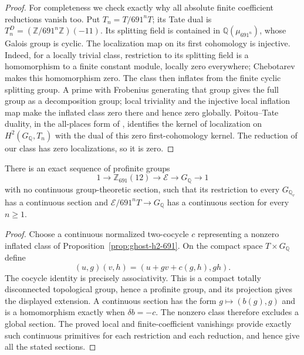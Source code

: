 \begin{proof}
For completeness we check exactly why all absolute finite
coefficient reductions vanish too. Put
\(T_n=T/691^nT\); its Tate dual is
\(T_n^D=(\mathbb Z/691^n\mathbb Z)(-11)\). Its splitting
field is contained in \(\mathbb Q(\mu_{691^n})\), whose Galois
group is cyclic. The localization map on its first cohomology
is injective. Indeed, for a locally trivial class, restriction
to its splitting field is a homomorphism to a finite constant
module, locally zero everywhere; Chebotarev makes this
homomorphism zero. The class then inflates from the finite
cyclic splitting group. A prime with Frobenius generating
that group gives the full group as a decomposition group;
local triviality and the injective local inflation map make
the inflated class zero there and hence zero globally.
Poitou--Tate duality, in the all-places form of
\cite[I.4.10]{GhostMilneADT}, identifies the kernel of
localization on \(H^2(G_{\mathbb Q},T_n)\) with the dual
of this zero first-cohomology kernel. The reduction of our
class has zero localizations, so it is zero.
\end{proof}

\begin{corollary}
\label{cor:ghost-integral-extension}
There is an exact sequence of profinite groups
\[
  1\longrightarrow\mathbb Z_{691}(12)
    \longrightarrow\mathcal E\longrightarrow G_{\mathbb Q}
    \longrightarrow1
\]
with no continuous group-theoretic section, such that its
restriction to every \(G_{\mathbb Q_v}\) has a continuous
section and \(\mathcal E/691^nT\to G_{\mathbb Q}\) has a
continuous section for every \(n\geq1\).
\end{corollary}
\begin{proof}
Choose a continuous normalized two-cocycle \(c\) representing
a nonzero inflated class of Proposition~\ref{prop:ghost-h2-691}.
On the compact space \(T\times G_{\mathbb Q}\) define
\[
 (u,g)(v,h)=(u+g v+c(g,h),gh).
\]
The cocycle identity is precisely associativity. This is a
compact totally disconnected topological group, hence a
profinite group, and its projection gives the displayed
extension. A continuous section has the form \(g\mapsto(b(g),g)\)
and is a homomorphism exactly when \(\delta b=-c\).
The nonzero class therefore excludes a global section. The
proved local and finite-coefficient vanishings provide exactly
such continuous primitives for each restriction and each
reduction, and hence give all the stated sections.
\end{proof}

